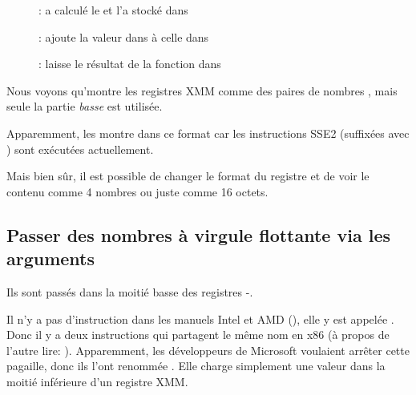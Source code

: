 \clearpage
\begin{figure}[H]
\centering
{}
\caption{\olly:  a calculé le  et l'a stocké
dans }
\label{fig:FPU_SIMD_simple_olly3}
\end{figure}

\clearpage
\begin{figure}[H]
\centering
{}
\caption{\olly:  ajoute la valeur dans  à celle dans }
\label{fig:FPU_SIMD_simple_olly4}
\end{figure}

\clearpage
\begin{figure}[H]
\centering
{}
\caption{\olly: \FLD laisse le résultat de la fonction dans }
\label{fig:FPU_SIMD_simple_olly5}
\end{figure}

Nous voyons qu'\olly montre les registres XMM comme des paires de nombres \Tdouble,
mais seule la partie \emph{basse} est utilisée.

Apparemment, \olly les montre dans ce format car les instructions SSE2 (suffixées
avec ) sont exécutées actuellement.

Mais bien sûr, il est possible de changer le format du registre et de voir le contenu
comme 4 nombres \Tfloat{} ou juste comme 16 octets.

\clearpage
\subsection{Passer des nombres à virgule flottante via les arguments}



Ils sont passés dans la moitié basse des registres -.



Il n'y a pas d'instruction  dans les manuels Intel et AMD (),
elle y est appelée .
Donc il y a deux instructions qui partagent le même nom en x86 (à propos de l'autre
lire: ).
Apparemment, les développeurs de Microsoft voulaient arrêter cette pagaille, donc
ils l'ont renommée .
Elle charge simplement une valeur dans la moitié inférieure d'un registre XMM.

